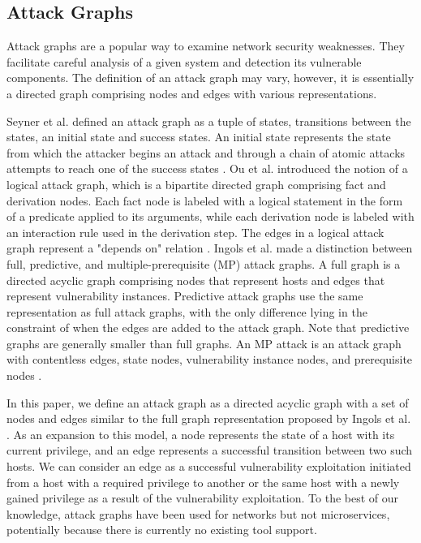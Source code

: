 \subsection{Attack Graphs}
\label{chap:attack_graphs}

Attack graphs \cite{sheyner2002automated} are a popular way to examine network security weaknesses. They facilitate careful analysis of a given system and detection its vulnerable components. The definition of an attack graph may vary, however, it is essentially a directed graph comprising nodes and edges with various representations.

Seyner et al. defined an attack graph as a tuple of states, transitions between the states, an initial state and success states. An initial state represents the state from which the attacker begins an attack and through a chain of atomic attacks attempts to reach one of the success states \cite{sheyner2002automated}. Ou et al. introduced the notion of a logical attack graph, which is a bipartite directed graph comprising fact and derivation nodes. Each fact node is labeled with a logical statement in the form of a predicate applied to its arguments, while each derivation node is labeled with an interaction rule used in the derivation step. The edges in a logical attack graph represent a "depends on" relation \cite{ou2006scalable}. Ingols et al. made a distinction between full, predictive, and multiple-prerequisite (MP) attack graphs. A full graph is a directed acyclic graph comprising nodes that represent hosts and edges that represent vulnerability instances. Predictive attack graphs use the same representation as full attack graphs, with the only difference lying in the constraint of when the edges are added to the attack graph. Note that predictive graphs are generally smaller than full graphs. An MP attack is an attack graph with contentless edges, state nodes, vulnerability instance nodes, and prerequisite nodes \cite{ingols2006practical}.

In this paper, we define an attack graph as a directed acyclic graph with a set of nodes and edges similar to the full graph representation proposed by Ingols et al. \cite{ingols2006practical}. As an expansion to this model, a node represents the state of a host with its current privilege, and an edge represents a successful transition between two such hosts. We can consider an edge as a successful vulnerability exploitation initiated from a host with a required privilege to another or the same host with a newly gained privilege as a result of the vulnerability exploitation. To the best of our knowledge, attack graphs have been used for networks but not microservices, potentially because there is currently no existing tool support. 